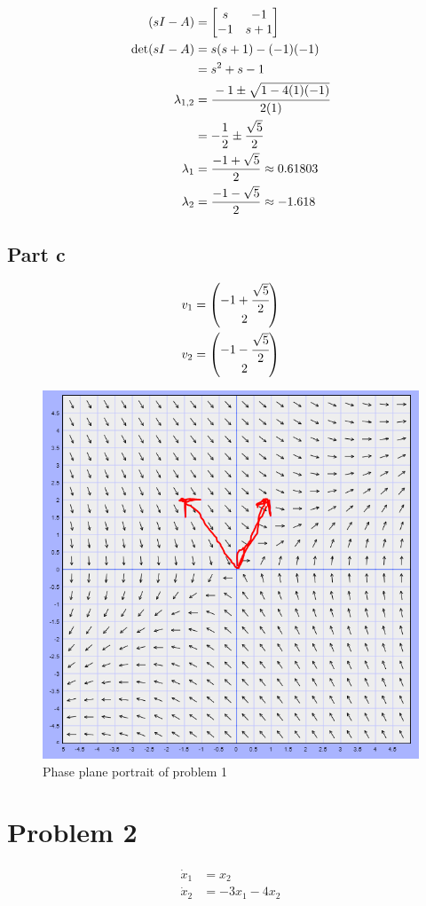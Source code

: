 \documentclass[]{article}
\begin{document}
\begin{align*}
	(sI - A)
	&= \mqty[s & -1\\ -1 & s+1]\\
	\det(sI-A)
	&= s(s+1) - (-1)(-1)\\
	&= s^2 + s - 1\\
	\lambda_{1,2}
	&= \cfrac{-1 \pm \sqrt{1 - 4(1)(-1)}}{2(1)}\\
	&= -\frac{1}{2} \pm \frac{\sqrt{5}}{2}\\
	\lambda_1
	&= \frac{-1 + \sqrt{5}}{2} \approx 0.61803\\
	\lambda_2
	&= \frac{-1 - \sqrt{5}}{2} \approx -1.618
\end{align*}

\subsection{Part c}

\begin{align*}
	v_1 &= \mqty(-1 + \cfrac{\sqrt{5}}{2}\\ 2)\\
	v_2 &= \mqty(-1 - \cfrac{\sqrt{5}}{2}\\ 2)
\end{align*}

\begin{figure}[p]
	\centering
	\includegraphics[width=0.7\linewidth]{fig/pblm1_w_vectors}
	\caption{Phase plane portrait of problem 1}
	\label{fig:pblm1}
\end{figure}


\newpage
\section{Problem 2}
\begin{align*}
	\dot{x}_1 &= x_2\\
	\dot{x}_2 &= -3 x_1 - 4 x_2
\end{align*}
\end{document}
